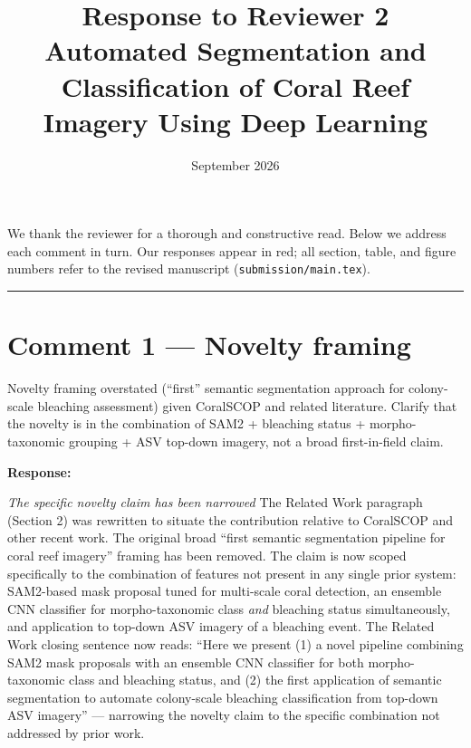 \documentclass[12pt]{article}
\title{\textbf{Response to Reviewer 2}\\[4pt]
       \large Automated Segmentation and Classification of Coral Reef Imagery
       Using Deep Learning}
\author{}
\date{September 2026}
\newcommand{\resp}[1]{\textcolor{respblue}{#1}}
\newenvironment{reviewercomment}{%
  \begin{mdframed}[backgroundcolor=gray!10,linecolor=gray!40,
                   leftmargin=0pt,rightmargin=0pt,
                   innerleftmargin=8pt,innerrightmargin=8pt,
                   innertopmargin=6pt,innerbottommargin=6pt]
  \itshape\color{quotegray}%
}{%
  \end{mdframed}%
}
\newenvironment{response}{%
  \vspace{4pt}%
  \color{respblue}%
  \noindent\textbf{Response:}\space
}{%
  \vspace{10pt}%
}
\begin{document}
\maketitle
\thispagestyle{empty}

We thank the reviewer for a thorough and constructive read. Below we address
each comment in turn. Our responses appear in \resp{red}; all section, table,
and figure numbers refer to the revised manuscript (\texttt{submission/main.tex}).

\bigskip
\noindent\rule{\linewidth}{0.4pt}
\bigskip

\section*{Comment 1 --- Novelty framing}

\begin{reviewercomment}
Novelty framing overstated (``first'' semantic segmentation approach for
colony-scale bleaching assessment) given CoralSCOP and related literature.
Clarify that the novelty is in the combination of SAM2 + bleaching status +
morpho-taxonomic grouping + ASV top-down imagery, not a broad first-in-field
claim.
\end{reviewercomment}

\begin{response}
\textit{The specific novelty claim has been narrowed}  The Related Work paragraph (Section 2) was
rewritten to situate the contribution relative to CoralSCOP
\citet{zheng2024} and other recent work.  The original broad ``first
semantic segmentation pipeline for coral reef imagery'' framing has been removed.
The claim is now scoped specifically to the combination of features not present
in any single prior system: SAM2-based mask proposal tuned for multi-scale coral
detection, an ensemble CNN classifier for morpho-taxonomic class \emph{and}
bleaching status simultaneously, and application to top-down ASV imagery of a
bleaching event.  The Related Work closing sentence now reads: ``Here we present
(1) a novel pipeline combining SAM2 mask proposals with an ensemble CNN
classifier for both morpho-taxonomic class and bleaching status, and (2) the
first application of semantic segmentation to automate colony-scale bleaching
classification from top-down ASV imagery'' --- narrowing the novelty claim to
the specific combination not addressed by prior work.
\end{response}
\end{document}
